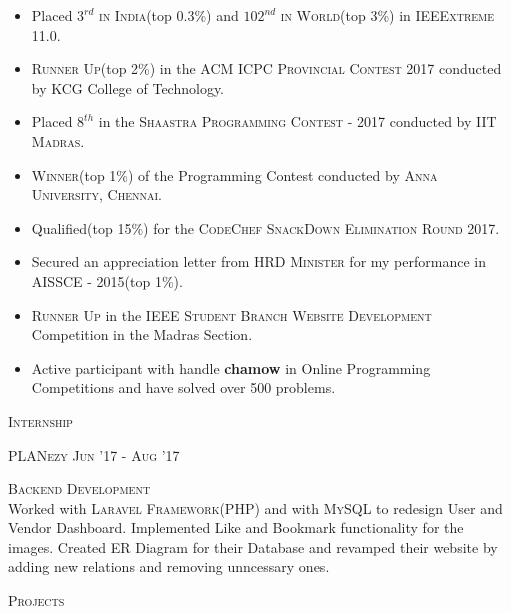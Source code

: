 \documentclass[10pt]{article}
\begin{document}
	\begin{itemize}
	\setlength\itemsep{-0.25em}
	\item Placed \textsc{$3^{rd}$ in India}(top 0.3\%) and \textsc{$102^{nd}$ in World}(top 3\%) in \textsc{IEEExtreme 11.0}.
	\item \textsc{Runner Up}(top 2\%) in the \textsc{ACM ICPC Provincial Contest 2017} conducted by KCG College of Technology.
	\item Placed \textsc{$8^{th}$} in the \textsc{Shaastra Programming Contest - 2017} conducted by \textsc{IIT Madras}.
	\item \textsc{Winner}(top 1\%) of the Programming Contest conducted by \textsc{Anna University, Chennai}.
	\item Qualified(top 15\%) for the \textsc{CodeChef SnackDown Elimination Round 2017}.
	\item Secured an appreciation letter from \textsc{HRD Minister} for my performance in \textsc{AISSCE - 2015}(top 1\%).
	\item \textsc{Runner Up} in the \textsc{IEEE Student Branch Website Development} Competition in the Madras Section.
	\item Active participant with handle \textbf{chamow} in Online Programming Competitions and have solved over 500 problems.

	
	\end{itemize}
	\vspace{2mm}
	{\centering\Large{\textsc{Internship}}	\hrulefill}
	
	\vspace{2mm}
	
	\large\textsc{PLANezy}
	\hfill{\small{\textsc{Jun '17 - Aug '17}}}
	
	\begin{changemargin}{1.0cm}{0.0cm} 
	{
	\large{\textsc{{Backend Development}}}  \\
	\small{Worked with \textsc{Laravel Framework}(PHP) and with \textsc{MySQL} to redesign User and Vendor Dashboard. Implemented Like and Bookmark functionality for the images. Created ER Diagram for their Database and revamped their website by adding new relations and removing unncessary ones.} 		
	}
	\end{changemargin} 	 	
	\vspace{2mm}

	{\centering\Large{\textsc{Projects}} \hrulefill}
		
	\vspace{3mm}
	
\end{document}
